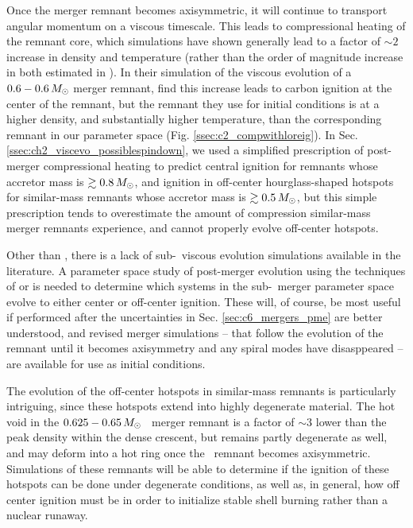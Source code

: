 Once the merger remnant becomes axisymmetric, it will continue to transport angular momentum on a viscous timescale.  This leads to compressional heating of the remnant core, which simulations \citep{schw+12, ji+13, rask+14} have shown generally lead to a factor of $\sim2$ increase in density and temperature (rather than the order of magnitude increase in both estimated in \citeal{vkercj10}).  In their simulation of the viscous evolution of a $0.6-0.6\,\Msun$ merger remnant, \cite{ji+13} find this increase leads to carbon ignition at the center of the remnant, but the remnant they use for initial conditions is at a higher density, and substantially higher temperature, than the corresponding remnant in our parameter space (Fig. \ref{ssec:c2_compwithloreig}).  In Sec. \ref{ssec:ch2_viscevo_possiblespindown}, we used a simplified prescription of post-merger compressional heating to predict central ignition for remnants whose accretor mass is $\gtrsim0.8\,\Msun$, and ignition in off-center hourglass-shaped hotspots for similar-mass remnants whose accretor mass is $\gtrsim0.5\,\Msun$, but this simple prescription tends to overestimate the amount of compression similar-mass merger remnants experience, and cannot properly evolve off-center hotspots.

Other than \cite{ji+13}, there is a lack of sub-\Mch\ viscous evolution simulations available in the literature.  A parameter space study of post-merger evolution using the techniques of \cite{schw+12} or \cite{ji+13} is needed to determine which systems in the sub-\Mch\ merger parameter space evolve to either center or off-center ignition.  These will, of course, be most useful if performced after the uncertainties in Sec. \ref{sec:c6_mergers_pme} are better understood, and revised merger simulations -- that follow the evolution of the remnant until it becomes axisymmetry and any spiral modes have disasppeared -- are available for use as initial conditions.

The evolution of the off-center hotspots in similar-mass remnants is particularly intriguing, since these hotspots extend into highly degenerate material.  The hot void in the $0.625-0.65\,\Msun$ \arepo\ merger remnant is a factor of $\sim3$ lower than the peak density within the dense crescent, but remains partly degenerate as well, and may deform into a hot ring once the \arepo\ remnant becomes axisymmetric.  Simulations of these remnants will be able to determine if the ignition of these hotspots can be done under degenerate conditions, as well as, in general, how off center ignition must be in order to initialize stable shell burning rather than a nuclear runaway.

